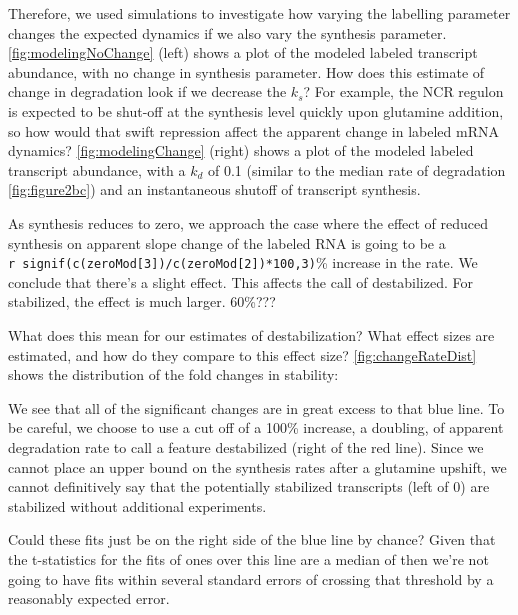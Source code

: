 Therefore, we used simulations to investigate how varying the labelling
parameter changes the expected dynamics if we also vary the synthesis
parameter. \autoref{fig:modelingNoChange} (left) shows a plot of the modeled
labeled transcript abundance, with no change in synthesis parameter.
How does this estimate of change in degradation look if we decrease the
\(k_s\)? For example, the NCR regulon is expected to be shut-off at the
synthesis level quickly upon glutamine addition, so how would that swift
repression affect the apparent change in labeled mRNA dynamics?
\autoref{fig:modelingChange} (right) shows a plot of the modeled
labeled transcript abundance, with a $k_d$ of 0.1 (similar to the
median rate of degradation \autoref{fig:figure2bc}) 
and an instantaneous shutoff of transcript synthesis.


As synthesis reduces to zero, we approach the case where the effect of
reduced synthesis on apparent slope change of the labeled RNA is going
to be a \texttt{r\ signif(c(zeroMod{[}3{]})/c(zeroMod{[}2{]})*100,3)}\%
increase in the rate.
We conclude that there's a slight effect.
This affects the call of destabilized.
For stabilized, the effect is much larger. 60\%???

What does this mean for our estimates of destabilization? What effect
sizes are estimated, and how do they compare to this effect size?
\autoref{fig:changeRateDist} shows the distribution of the fold changes in
stability:


We see that all of the significant changes are in great excess to that
blue line. To be careful, we choose to use a cut off of a 100\%
increase, a doubling, of apparent degradation rate to call a feature
destabilized (right of the red line). Since we cannot place an upper
bound on the synthesis rates after a glutamine upshift, we cannot
definitively say that the potentially stabilized transcripts (left of 0)
are stabilized without additional experiments.

Could these fits just be on the right side of the blue line by chance?
Given that the t-statistics for the fits of ones over this line are a
median of
then we're not going to have fits within several standard errors of
crossing that threshold by a reasonably expected error.

